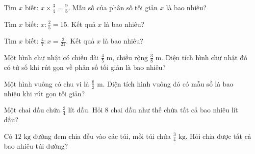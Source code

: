 \begin{ex}
  Tìm $x$ biết: $x \times \frac{3}{4} = \frac{9}{8}$. Mẫu số của phân số tối giản $x$ là bao nhiêu?
\end{ex}

\begin{ex}
  Tìm $x$ biết: $x : \frac{2}{5} = 15$. Kết quả $x$ là bao nhiêu?
\end{ex}

\begin{ex}
  Tìm $x$ biết: $\frac{4}{7} : x = \frac{2}{21}$. Kết quả $x$ là bao nhiêu?
\end{ex}

\begin{ex}
  Một hình chữ nhật có chiều dài $\frac{4}{5}\text{ m}$, chiều rộng $\frac{3}{8}\text{ m}$. Diện tích hình chữ nhật đó có tử số khi rút gọn về phân số tối giản là bao nhiêu?
\end{ex}

\begin{ex}
  Một hình vuông có chu vi là $\frac{8}{3}\text{ m}$. Diện tích hình vuông đó có mẫu số là bao nhiêu khi rút gọn tối giản?
\end{ex}

\begin{ex}
  Một chai dầu chứa $\frac{3}{4}$ lít dầu. Hỏi $8$ chai dầu như thế chứa tất cả bao nhiêu lít dầu?
\end{ex}

\begin{ex}
  Có $12\text{ kg}$ đường đem chia đều vào các túi, mỗi túi chứa $\frac{3}{4}\text{ kg}$. Hỏi chia được tất cả bao nhiêu túi đường?
\end{ex}

